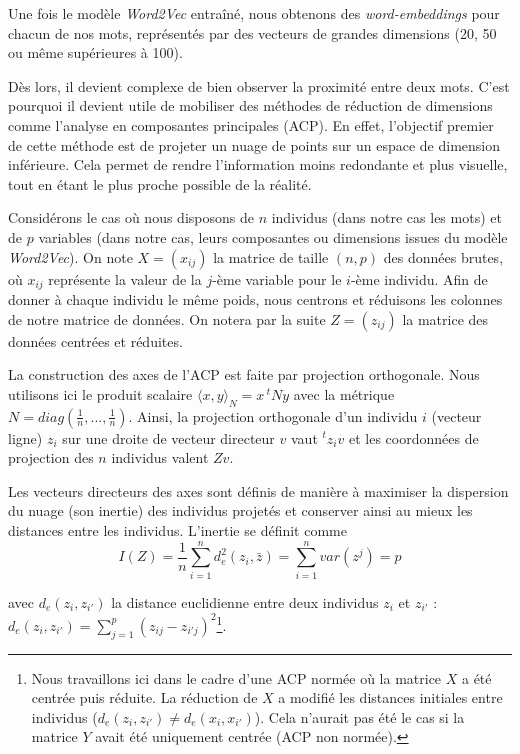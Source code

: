 \documentclass[11pt,french,french]{article}
\let\rmarkdownfootnote\footnote%
\def\footnote{\protect\rmarkdownfootnote}
\begin{document}
Une fois le modèle \emph{Word2Vec} entraîné, nous obtenons des
\emph{word-embeddings} pour chacun de nos mots, représentés par des
vecteurs de grandes dimensions (20, 50 ou même supérieures à 100).

Dès lors, il devient complexe de bien observer la proximité entre deux
mots. C'est pourquoi il devient utile de mobiliser des méthodes de
réduction de dimensions comme l'analyse en composantes principales
(ACP). En effet, l'objectif premier de cette méthode est de projeter un
nuage de points sur un espace de dimension inférieure. Cela permet de
rendre l'information moins redondante et plus visuelle, tout en étant le
plus proche possible de la réalité.

Considérons le cas où nous disposons de \(n\) individus (dans notre cas
les mots) et de \(p\) variables (dans notre cas, leurs composantes ou
dimensions issues du modèle \emph{Word2Vec}). On note \(X = (x_{ij})\)
la matrice de taille \((n,p)\) des données brutes, où \(x_{ij}\)
représente la valeur de la \(j\)-ème variable pour le \(i\)-ème
individu. Afin de donner à chaque individu le même poids, nous centrons
et réduisons les colonnes de notre matrice de données. On notera par la
suite \(Z = (z_{ij})\) la matrice des données centrées et réduites.

La construction des axes de l'ACP est faite par projection orthogonale.
Nous utilisons ici le produit scalaire
\(\langle x,y\rangle_{N} = x\,^t N y\) avec la métrique
\(N = diag(\frac{1}{n},...,\frac{1}{n})\). Ainsi, la projection
orthogonale d'un individu \(i\) (vecteur ligne) \(z_i\) sur une droite
de vecteur directeur \(v\) vaut \(^tz_iv\) et les coordonnées de
projection des \(n\) individus valent \(Zv\).

Les vecteurs directeurs des axes sont définis de manière à maximiser la
dispersion du nuage (son inertie) des individus projetés et conserver
ainsi au mieux les distances entre les individus. L'inertie se définit
comme \[I(Z) = \frac{1}{n} \sum \limits_{i = 1}^n d_{e}^2(z_i,\bar{z}) =
\sum \limits_{i = 1}^n var(z^j) = p\]

avec \(d_{e}(z_i,z_{i'})\) la distance euclidienne entre deux individus
\(z_i\) et \(z_{i'}\) :
\(d_{e}(z_i,z_{i'}) = \sum \limits_{j=1}^p (z_{ij} - z_{i'j})^2\)\footnote{Nous
  travaillons ici dans le cadre d'une ACP normée où la matrice \(X\) a
  été centrée puis réduite. La réduction de \(X\) a modifié les
  distances initiales entre individus
  (\(d_{e}(z_i,z_{i'}) \neq d_{e}(x_i,x_{i'})\)). Cela n'aurait pas été
  le cas si la matrice \(Y\) avait été uniquement centrée (ACP non
  normée).}.
\end{document}
